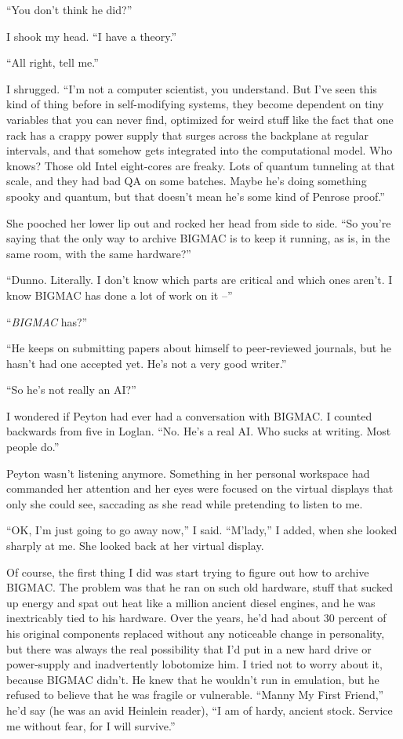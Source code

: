 “You don't think he did?”

I shook my head. “I have a theory.”

“All right, tell me.”

I shrugged. “I'm not a computer scientist, you understand. But I've 
seen this kind of thing before in self-modifying systems, they become 
dependent on tiny variables that you can never find, optimized for 
weird stuff like the fact that one rack has a crappy power supply that 
surges across the backplane at regular intervals, and that somehow gets 
integrated into the computational model. Who knows? Those old Intel 
eight-cores are freaky. Lots of quantum tunneling at that scale, and 
they had bad QA on some batches. Maybe he's doing something spooky and 
quantum, but that doesn't mean he's some kind of Penrose proof.”

She pooched her lower lip out and rocked her head from side to side. 
“So you're saying that the only way to archive BIGMAC is to keep it 
running, as is, in the same room, with the same hardware?”

“Dunno. Literally. I don't know which parts are critical and which 
ones aren't. I know BIGMAC has done a lot of work on it --”

“\emph{BIGMAC} has?”

“He keeps on submitting papers about himself to peer-reviewed 
journals, but he hasn't had one accepted yet. He's not a very good 
writer.”

“So he's not really an AI?”

I wondered if Peyton had ever had a conversation with BIGMAC. I counted 
backwards from five in Loglan. “No. He's a real AI. Who sucks at 
writing. Most people do.”

Peyton wasn't listening anymore. Something in her personal workspace 
had commanded her attention and her eyes were focused on the virtual 
displays that only she could see, saccading as she read while 
pretending to listen to me.

“OK, I'm just going to go away now,” I said. “M'lady,” I added, 
when she looked sharply at me. She looked back at her virtual display.

\tb

Of course, the first thing I did was start trying to figure out how to 
archive BIGMAC. The problem was that he ran on such old hardware, stuff 
that sucked up energy and spat out heat like a million ancient diesel 
engines, and he was inextricably tied to his hardware. Over the years, 
he'd had about 30 percent of his original components replaced without 
any noticeable change in personality, but there was always the real 
possibility that I'd put in a new hard drive or power-supply and 
inadvertently lobotomize him. I tried not to worry about it, because 
BIGMAC didn't. He knew that he wouldn't run in emulation, but he 
refused to believe that he was fragile or vulnerable. “Manny My First 
Friend,” he'd say (he was an avid Heinlein reader), “I am of hardy, 
ancient stock. Service me without fear, for I will survive.”

